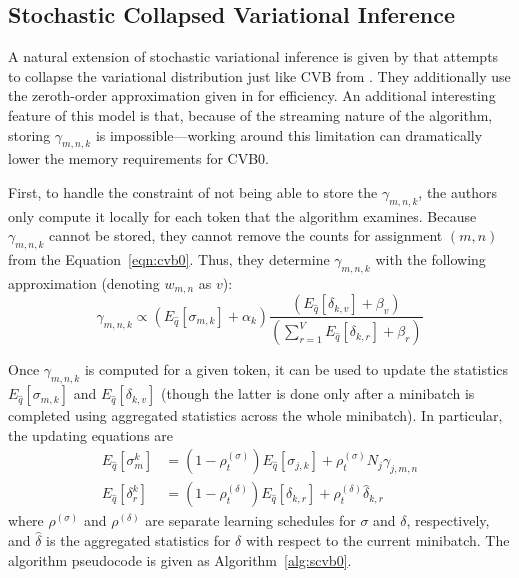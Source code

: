 \documentclass[11pt]{article}
\begin{document}
\subsection{Stochastic Collapsed Variational Inference}
A natural extension of stochastic variational inference is given by
\citet{Foulds:2013:scvb} that attempts to collapse the variational
distribution just like CVB from \citet{Teh:2007:CVB}. They additionally use
the zeroth-order approximation given in \citet{Asuncion:2009:onsmoothing}
for efficiency. An additional interesting feature of this model is that,
because of the streaming nature of the algorithm, storing $\gamma_{m,n,k}$
is impossible---working around this limitation can dramatically lower the
memory requirements for CVB0.

First, to handle the constraint of not being able to store the
$\gamma_{m,n,k}$, the authors only compute it locally for each token that
the algorithm examines. Because $\gamma_{m,n,k}$ cannot be stored, they
cannot remove the counts for assignment $(m,n)$ from the
Equation~\ref{eqn:cvb0}. Thus, they determine $\gamma_{m,n,k}$ with the
following approximation (denoting $w_{m,n}$ as $v$):
\begin{equation}
  \gamma_{m,n,k} \propto \left(E_{\hat{q}}[\sigma_{m,k}] + \alpha_k\right)
  \frac{\left(E_{\hat{q}}[\delta_{k,v}] + \beta_v\right)}
  {\left(\sum_{r=1}^V E_{\hat{q}}[\delta_{k,r}] + \beta_r\right)}
  \label{eqn:scvb0gamma}
\end{equation}

Once $\gamma_{m,n,k}$ is computed for a given token, it can be used to
update the statistics $E_{\hat{q}}[\sigma_{m,k}]$ and
$E_{\hat{q}}[\delta_{k,v}]$ (though the latter is done only after a minibatch
is completed using aggregated statistics across the whole minibatch). In
particular, the updating equations are
\begin{align}
  E_{\hat{q}}[\sigma_m^k] &=
  (1-\rho_t^{(\sigma)}) E_{\hat{q}}[\sigma_{j,k}] + \rho_t^{(\sigma)} N_j
  \gamma_{j,m,n}
  \label{eqn:scvb0sigma} \\
  E_{\hat{q}}[\delta_r^k] &=
  (1-\rho_t^{(\delta)}) E_{\hat{q}}[\delta_{k,r}] + \rho_t^{(\delta)}
  \hat{\delta}_{k,r}
  \label{eqn:scvb0delta}
\end{align}
where $\rho^{(\sigma)}$ and $\rho^{(\delta)}$ are separate learning schedules for
$\sigma$ and $\delta$, respectively, and $\hat{\delta}$ is the aggregated
statistics for $\delta$ with respect to the current minibatch. The
algorithm pseudocode is given as Algorithm~\ref{alg:scvb0}.
\end{document}
